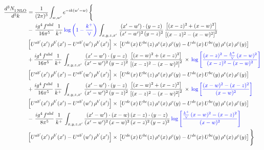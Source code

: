 \documentclass[10pt]{article}
\numberwithin{equation}{section}
\newcommand{\new}[1]{{\color{blue}#1}}
\begin{document}
\begin{align}
   \frac{d^{3}N_{1\,\rm NLO}^{\rm}}{d^{3}k}  & =  \frac{1}{(2\pi)^{3}}  \int_{w, w^\prime} e^{-ik(w^\prime-w)}\, \Bigg\{\notag \\
& -\,\frac{ig^{4}\,f^{abd}}{16\pi^{5}}\,\frac{1}{k^{+}}\, \new{\log{\left(1-\frac{k^{+}}{\vee}\right)}}\,\int_{x,y,z,x'}\, \frac{(x'-w')\cdot (y-z)}{(x'-w')^{2}\,(y-z)^{2}}\,\frac{\left[(x-z)^{2}+(x-w)^{2}\right]}{\left[(x-z)^{2}-(x-w)^{2}\right]^{2}}\notag \\ & \left[U^{ab'}(x')\,\rho^{b'}(x')-U^{ab'}(w')\, \rho^{b'}(x')\right]\times\, \left[U^{de}(x)\,U^{bc}(z)\, \rho^{e}(x)\,\rho^{c}(y)-U^{de}(x)\,U^{bc}(y)\,\rho^{e}(x)\,\rho^{c}(y)\right] \notag \\
&  +\frac{ig^{4}\,f^{abd}}{16\pi^{5}}\, \frac{1}{k^{+}}\,\int_{x,y,z,x'}\, \frac{(x'-w')\cdot (y-z)}{(x'-w')^{2}\,(y-z)^{2}}\, \frac{\left[(x-w)^{2}+(x-z)^{2}\right]}{\left[(x-z)^{2}-(x-w)^{2}\right]^{2}}\, \times\, \new{\log{\left[\frac{(x-z)^{2}-\frac{k^{+}}{\vee}\,(x-w)^{2}}{(x-z)^{2}-(x-w)^{2}}\right]}}\notag \\ & \left[U^{ab'}(x')\,\rho^{b'}(x')-U^{ab'}(w')\, \rho^{b'}(x')\right]\times\, \left[U^{de}(x)\,U^{bc}(z)\, \rho^{e}(x)\,\rho^{c}(y)-U^{de}(x)\,U^{bc}(y)\,\rho^{e}(x)\,\rho^{c}(y)\right] \notag \\
&   +\frac{ig^{4}\,f^{abd}}{16\pi^{5}}\, \frac{1}{k^{+}}\,\int_{x,y,z,x'}\, \frac{(x'-w')\cdot (y-z)}{(x'-w')^{2}\,(y-z)^{2}}\, \frac{\left[(x-w)^{2}+(x-z)^{2}\right]}{\left[(x-z)^{2}-(x-w)^{2}\right]^{2}}\, \times\, \new{\log{\left[\frac{(x-w)^{2}-(x-z)^{2}}{(x-w)^{2}}\right]}}\notag \\ & \left[U^{ab'}(x')\,\rho^{b'}(x')-U^{ab'}(w')\, \rho^{b'}(x')\right]\times\, \left[U^{de}(x)\,U^{bc}(z)\, \rho^{e}(x)\,\rho^{c}(y)-U^{de}(x)\,U^{bc}(y)\,\rho^{e}(x)\,\rho^{c}(y)\right] \notag \\
& -\, \frac{ig^{4}\,f^{abd}}{8\pi^{5}}\,\frac{1}{k^{+}}\,\int_{x,y,z,x'}\frac{(x'-w')\cdot (x-w)\, (x-z)\cdot (y-z)}{(x'-w')^{2}\, (x-w)^{2}\, (x-z)^{2}\, (y-z)^{2}}\,\new{\log{\left[\frac{\frac{k^{+}}{\vee}\,(x-w)^{2}-(x-z)^{2}}{(x-w)^{2}}\right]}} \notag \\ & \left[U^{ab'}(x')\,\rho^{b'}(x')-U^{ab'}(w')\, \rho^{b'}(x')\right]\times\, \left[U^{de}(x)\,U^{bc}(z)\, \rho^{e}(x)\,\rho^{c}(y)-U^{de}(x)\,U^{bc}(y)\,\rho^{e}(x)\,\rho^{c}(y)\right]\Bigg\} \label{eq:F:G1IIIN1}
\end{align}
\end{document}
